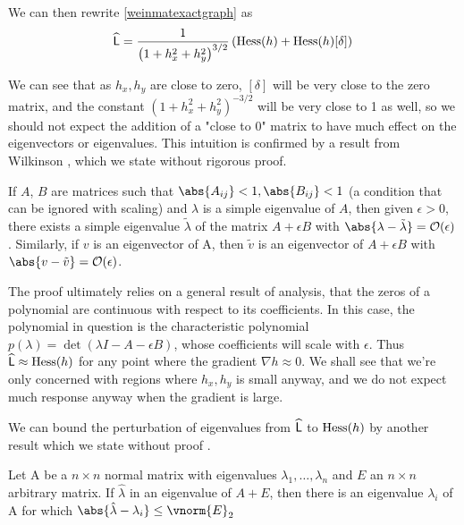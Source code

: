 We can then rewrite \cref{weinmatexactgraph} as 
\begin{equation}
\widehat{\mathsf{L}} = \frac{1}{\left(1+h_x^2 + h_y^2\right)^{3/2}}\left( \mathrm{Hess}(h)
+  \mathrm{Hess}(h) [\delta]\right)
\end{equation}

We can see that as $h_x, h_y$ are close to zero, $[\delta]$ will be very close to the zero matrix, and the constant $\left(1+h_x^2 + h_y^2\right)^{-3/2}$ will be very close to 1 as well, so we should not expect the addition of a "close to 0" matrix to have much effect on the eigenvectors or eigenvalues. This intuition is confirmed by a result from Wilkinson \cite{wilkinson-eigenvalue}, which we state without rigorous proof.

\begin{theorem}
	If $A$, $B$ are matrices such that $\abs{A_{ij}} < 1 , \abs{B_{ij}} < 1$ (a condition that can be ignored with scaling) and $\lambda$ is a simple eigenvalue of $A$, then given $\epsilon > 0$, there exists a simple eigenvalue $\tilde{\lambda}$ of the matrix $A + \epsilon B$ with $\abs{\lambda - \tilde{\lambda}} = \bigO(\epsilon)$. Similarly, if $v$ is an eigenvector of A, then $\tilde{v}$ is an eigenvector of $A + \epsilon B$ with
	$\abs{v - \tilde{v}} = \bigO(\epsilon)$.
\end{theorem}

The proof ultimately relies on a general result of analysis, that the zeros of a polynomial are continuous with respect to its coefficients. In this case, the polynomial in question is the characteristic polynomial
$p(\lambda) = \det(\lambda I - A - \epsilon B)$, whose coefficients will scale with $\epsilon$. Thus $\widehat{\mathsf{L}} \approx \mathrm{Hess}(h)$ for any point where the gradient $\nabla h \approx 0$. We shall see that we're only concerned with regions where $h_x, h_y$ is small anyway, and we do not expect much response anyway when the gradient is large. 

We can bound the perturbation of eigenvalues from $\widehat{\mathsf{L}}$ to $\mathrm{Hess}(h)$ by another result
which we state without proof \cite{matrix-analysis-horn}.

\begin{theorem}
	Let A be a $n\times n$ normal matrix with eigenvalues $\lambda_1, \dots, \lambda_n$ and $E$ an $n \times n$ arbitrary matrix. If $\hat{\lambda} $ in an eigenvalue of $A + E$, then there is an eigenvalue $\lambda_i$ of A for which
		$\abs{\hat{\lambda} - \lambda_i} \leq \vnorm{E}_2$
\end{theorem}

